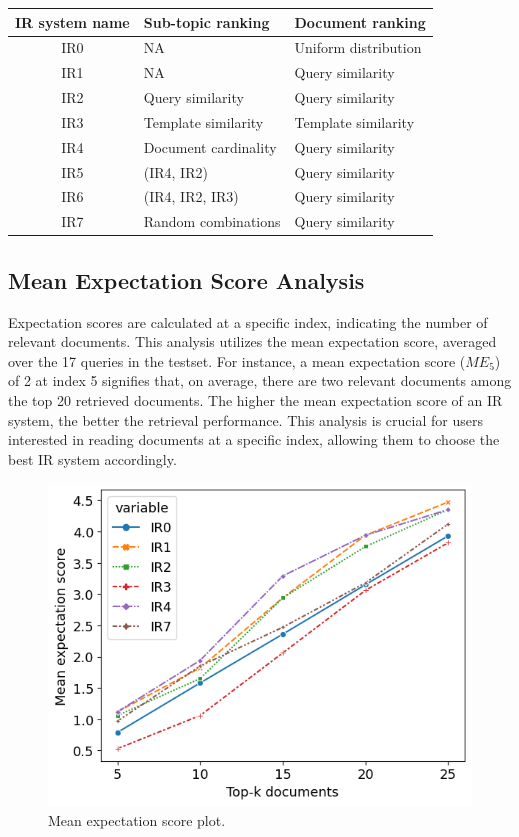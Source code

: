 \begin{center}
	\label{tab:ir_system_intro}
	\begin{tabularx}{0.8\textwidth}{|c|Y|Y|}
		\hline
		IR system name & Sub-topic ranking & Document ranking \\
		\hline
		IR0 & NA & Uniform distribution  \\
		\hline
		IR1 & NA & Query similarity \\
		\hline
		IR2 & Query similarity & Query similarity \\
		\hline
		IR3 & Template similarity & Template similarity \\
		\hline
		IR4 & Document cardinality & Query similarity \\
		\hline
		IR5 & (IR4, IR2) &  Query similarity \\
		\hline
		IR6 & (IR4, IR2, IR3) & Query similarity \\
		\hline
		IR7 & Random combinations & Query similarity  \\
		\hline
	\end{tabularx}
\end{center}

\subsection{Mean Expectation Score Analysis}

Expectation scores are calculated at a specific index, indicating the number of relevant documents. This analysis utilizes the mean expectation score, averaged over the 17 queries in the testset. For instance, a mean expectation score ($ME_5$) of 2 at index 5 signifies that, on average, there are two relevant documents among the top 20 retrieved documents. The higher the mean expectation score of an \ac{IR} system, the better the retrieval performance. This analysis is crucial for users interested in reading documents at a specific index, allowing them to choose the best \ac{IR} system accordingly.

\begin{figure}[h]
	\centering
	\includegraphics[width=.85\textwidth]{images/subplots/mean_expectation_score.png}
	\caption{Mean expectation score plot. \label{fig:mae_fig}}
\end{figure}

